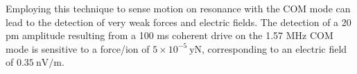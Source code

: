 \documentclass[aps,prl,onecolumn,superscriptaddress,floatfix]{revtex4-1}
\begin{document}
Employing this technique to sense motion on resonance with the COM mode
can lead to the detection of very weak forces and electric fields.
The detection of a 20 pm amplitude resulting from a 100 ms coherent
drive on the 1.57 MHz COM mode is
sensitive to a force/ion of $5 \times 10^{-5}\:\mathrm{yN}$, corresponding
to an electric field of $0.35\:\mathrm{nV/m}$.



\end{document}
